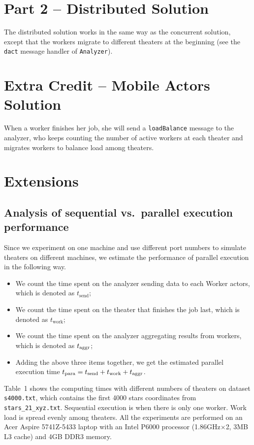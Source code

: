 \documentclass[12pt,letterpaper]{article}
\begin{document}
\section*{Part 2 -- Distributed Solution}
The distributed solution works in the same way as the concurrent solution, except that the workers migrate to different theaters at the beginning (see the \texttt{dact} message handler of \texttt{Analyzer}).

\section*{Extra Credit -- Mobile Actors Solution}
When a worker finishes her job, she will send a \texttt{loadBalance} message to the analyzer, who keeps counting the number of active workers at each theater and migrates workers to balance load among theaters.

\section*{Extensions}
\subsection*{Analysis of sequential vs.~parallel execution performance}
Since we experiment on one machine and use different port numbers to simulate theaters on different machines, we estimate the performance of parallel execution in the following way.
\begin{itemize}
\item We count the time spent on the analyzer sending data to each Worker actors, which is denoted as $t_{\textrm{send}}$;
\item We count the time spent on the theater that finishes the job last, which is denoted as $t_{\textrm{work}}$;
\item We count the time spent on the analyzer aggregating results from workers, which is denoted as $t_{\rm aggr}$;
\item Adding the above three items together, we get the estimated parallel execution time $t_{\rm para} = t_{\textrm{send}}+t_{\textrm{work}}+t_{\rm aggr}$.
\end{itemize}

Table~1 shows the computing times with different numbers of theaters on dataset \texttt{s4000.txt}, which contains the first 4000 stars coordinates from \texttt{stars\_21\_xyz.txt}. Sequential execution is when there is only one worker. Work load is spread evenly among theaters. All the experiments are performed on an Acer Aspire 5741Z-5433 laptop with an Intel P6000 processor (1.86GHz$\times$2, 3MB L3 cache) and 4GB DDR3 memory.
\end{document}
